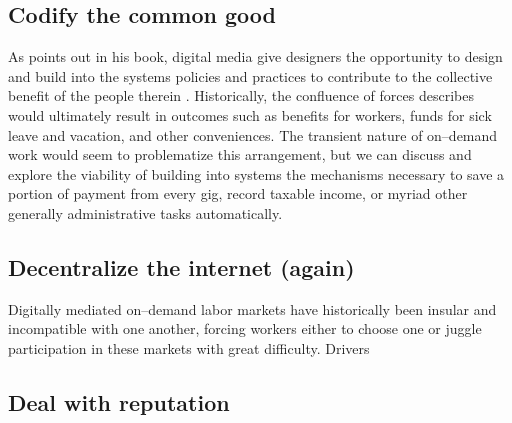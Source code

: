 \documentclass{sigchi}
\begin{document}
\subsection{Codify the common good}
As \citeauthor{lessig2006code} points out in his book,
digital media give designers the opportunity to design and build into the systems
policies and practices to contribute to the collective benefit of the people therein
\cite{lessig2006code}.
Historically, the confluence of forces \citeauthor{lessig2006code} describes
would ultimately result in outcomes such as benefits for workers,
funds for sick leave and vacation, and other conveniences.
The transient nature of on--demand work would seem to problematize this arrangement,
but we can discuss and explore the viability of building into systems the mechanisms necessary
to save a portion of payment from every gig,
record taxable income, or
myriad other generally administrative tasks automatically.


\subsection{Decentralize the internet (again)}
Digitally mediated on--demand labor markets have historically been insular and incompatible with one another,
forcing workers either to choose one or juggle participation in these markets with great difficulty.
Drivers 

\subsection{Deal with reputation}














\end{document}
